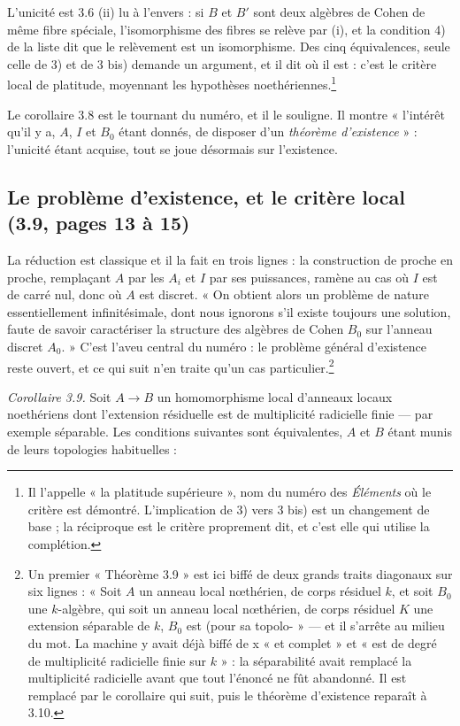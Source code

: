 \documentclass[11pt,a4paper]{article}
\begin{document}
L'unicité est 3.6 (ii) lu à l'envers : si $B$ et $B'$ sont deux algèbres de
Cohen de même fibre spéciale, l'isomorphisme des fibres se relève par (i), et
la condition 4) de la liste dit que le relèvement est un isomorphisme. Des cinq
équivalences, seule celle de 3) et de 3 bis) demande un argument, et il dit où
il est : c'est le critère local de platitude, moyennant les hypothèses
noethériennes.\footnote{Il l'appelle « la platitude supérieure », nom du numéro
des \emph{Éléments} où le critère est démontré. L'implication de 3) vers 3 bis)
est un changement de base ; la réciproque est le critère proprement dit, et
c'est elle qui utilise la complétion.}

Le corollaire 3.8 est le tournant du numéro, et il le souligne. Il montre
« l'intérêt qu'il y a, $A$, $I$ et $B_0$ étant donnés, de disposer d'un
\emph{théorème d'existence} » : l'unicité étant acquise, tout se joue
désormais sur l'existence.

\subsection*{Le problème d'existence, et le critère local (3.9, pages 13 à 15)}

La réduction est classique et il la fait en trois lignes : la construction de
proche en proche, remplaçant $A$ par les $A_i$ et $I$ par ses puissances,
ramène au cas où $I$ est de carré nul, donc où $A$ est discret. « On obtient
alors un problème de nature essentiellement infinitésimale, dont nous ignorons
s'il existe toujours une solution, faute de savoir caractériser la structure des
algèbres de Cohen $B_0$ sur l'anneau discret $A_0$. » C'est l'aveu central du
numéro : le problème général d'existence reste ouvert, et ce qui suit n'en
traite qu'un cas particulier.\footnote{Un premier « Théorème 3.9 » est ici
biffé de deux grands traits diagonaux sur six lignes : « Soit $A$ un anneau
local nœthérien, de corps résiduel $k$, et soit $B_0$ une $k$-algèbre, qui soit
un anneau local nœthérien, de corps résiduel $K$ une extension séparable de
$k$, $B_0$ est (pour sa topolo- » — et il s'arrête au milieu du mot. La machine
y avait déjà biffé de x « et complet » et « est de degré de multiplicité
radicielle finie sur $k$ » : la séparabilité avait remplacé la multiplicité
radicielle avant que tout l'énoncé ne fût abandonné. Il est remplacé
par le corollaire qui suit, puis le théorème d'existence reparaît à 3.10.}

\emph{Corollaire 3.9.} Soit $A \to B$ un homomorphisme local d'anneaux locaux
noethériens dont l'extension résiduelle est de multiplicité radicielle finie —
par exemple séparable. Les conditions suivantes sont équivalentes, $A$ et $B$
étant munis de leurs topologies habituelles :
\end{document}
